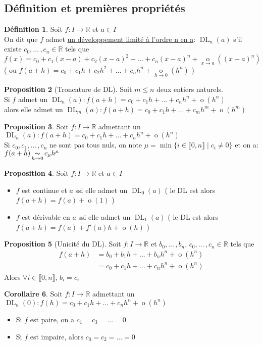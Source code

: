 \documentclass[10pt,a4paper]{article}
\theoremstyle{definition}
\newtheorem{proposition}{Proposition}[section]
\newtheorem{corollaire}[proposition]{Corollaire}
\newtheorem{definition}[proposition]{Définition}
\DeclareMathOperator*{\eqv}{\thicksim}
\DeclareMathOperator*{\negl}{o}
\DeclareMathOperator{\dl}{DL}
\begin{document}
\subsection{Définition et premières propriétés}
\begin{definition}
Soit $f: I \to \mathbb{R}$ et $a \in I$ \\
On dit que $f$ admet \uline{un développement limité à l'ordre n en a}: $\dl_n(a)$ s'il existe $c_0, ...\,, c_n \in \mathbb{R}$ tels que \\
$f(x) = c_0 + c_1(x - a) + c_2(x - a)^2 + ... + c_n(x - a)^n + \negl\limits_{x \to a}((x - a)^n)$ \\
( ou $f(a + h) = c_0 + c_1 h + c_2 h^2 + ... + c_n h^n + \negl\limits_{h \to 0}(h^n)$ )
\end{definition}
\begin{proposition}[Troncature de DL]
Soit $m \leq n$ deux entiers naturels. \\
Si $f$ admet un $\dl_n(a): f(a + h) = c_0 + c_1 h + ... + c_n h^n +\negl(h^n)$ \\
alors elle admet un $\dl_m(a): f(a + h) = c_0 + c_1 h + ... + c_m h^m + \negl(h^m)$
\end{proposition}
\begin{proposition}
Soit $f: I \to \mathbb{R}$ admettant un $\dl_n(a): f(a + h) = c_0 + c_1 h + ... + c_n h^n + \negl(h^n)$ \\
Si $c_0, c_1, ...\,, c_n$ ne sont pas tous nuls, on note $\mu = \min \{ i \in \llbracket 0, n \rrbracket \mid c_i \neq 0 \}$ et on a: $f(a + h) \eqv\limits_{h \to 0} c_\mu h^\mu$
\end{proposition}
\begin{proposition}
Soit $f: I \to \mathbb{R}$ et $a \in I$
\begin{itemize}
\item $f$ est continue et $a$ ssi elle admet un $\dl_0(a)$ ( le DL est alors $f(a + h) = f(a) + \negl(1)$ )
\item $f$ est dérivable en $a$ ssi elle admet un $\dl_1(a)$ ( le DL est alors $f(a + h) = f(a) + f'(a)h + \negl(h)$ )
\end{itemize}
\end{proposition}
\begin{proposition}[Unicité du DL]
Soit $f: I \to \mathbb{R}$ et $b_0, ...\,, b_n$, $c_0, ...\,, c_n \in \mathbb{R}$ tels que
\begin{align*}
f(a + h) &= b_0 + b_1 h + ... + b_n h^n + \negl(h^n) \\
         &= c_0 + c_1 h + ... + c_n h^n + \negl(h^n)
\end{align*}
Alors $\forall i \in \llbracket 0, n \rrbracket$, $b_i = c_i$
\end{proposition}
\begin{corollaire}
Soit $f: I \to \mathbb{R}$ admettant un $\dl_n(0): f(h) = c_0 + c_1 h + ... + c_n h^n + \negl(h^n)$
\begin{itemize}
\item Si $f$ est paire, on a $c_1 = c_3 = ... = 0$
\item Si $f$ est impaire, alors $c_0 = c_2 = ... = 0$
\end{itemize}
\end{corollaire}
\end{document}
